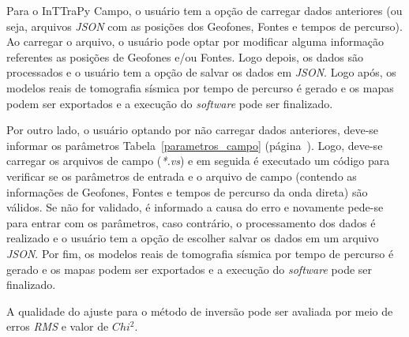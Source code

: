 \documentclass[a4paper, 12 pt]{article} %
\begin{document}
Para o InTTraPy Campo, o usuário tem a opção de carregar dados anteriores (ou seja, arquivos \textit{JSON} com as posições dos Geofones, Fontes e tempos de percurso). Ao carregar o arquivo, o usuário pode optar por modificar alguma informação referentes as posições de Geofones e/ou Fontes. Logo depois, os dados são processados e o usuário tem a opção de salvar os dados em \textit{JSON}. Logo após, os modelos reais de tomografia sísmica por tempo de percurso é gerado e os mapas podem ser exportados e a execução do \textit{software} pode ser finalizado. 

Por outro lado, o usuário optando por não carregar dados anteriores, deve-se informar os parâmetros Tabela~\ref{parametros_campo} (página~\pageref{parametros_campo}). Logo, deve-se carregar os arquivos de campo (\textit{*.vs}) e em seguida é executado um código para verificar se os parâmetros de entrada e o arquivo de campo (contendo as informações de Geofones, Fontes e tempos de percurso da onda direta) são válidos. Se não for validado, é informado a causa do erro e novamente pede-se para entrar com os parâmetros, caso contrário, o processamento dos dados é realizado e o usuário tem a opção de escolher salvar os dados em um arquivo \textit{JSON}. Por fim, os modelos reais de tomografia sísmica por tempo de percurso é gerado e os mapas podem ser exportados e a execução do \textit{software} pode ser finalizado. 

A qualidade do ajuste para o método de inversão pode ser avaliada por meio de erros \textit{RMS} e valor de $Chi^{2}$.
\end{document}
